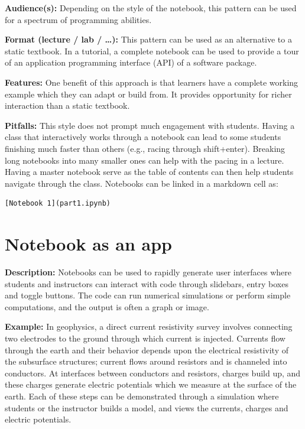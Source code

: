 \documentclass[]{book}
\begin{document}
\textbf{Audience(s):} Depending on the style of the notebook, this
pattern can be used for a spectrum of programming abilities.

\textbf{Format (lecture / lab / \ldots{}):} This pattern can be used as
an alternative to a static textbook. In a tutorial, a complete notebook
can be used to provide a tour of an application programming interface
(API) of a software package.

\textbf{Features:} One benefit of this approach is that learners have a
complete working example which they can adapt or build from. It provides
opportunity for richer interaction than a static textbook.

\textbf{Pitfalls:} This style does not prompt much engagement with
students. Having a class that interactively works through a notebook can
lead to some students finishing much faster than others (e.g., racing
through shift+enter). Breaking long notebooks into many smaller ones can
help with the pacing in a lecture. Having a master notebook serve as the
table of contents can then help students navigate through the class.
Notebooks can be linked in a markdown cell as:

\begin{verbatim}
[Notebook 1](part1.ipynb)
\end{verbatim}

\section{Notebook as an app}\label{notebook-as-an-app}

\textbf{Description:} Notebooks can be used to rapidly generate user
interfaces where students and instructors can interact with code through
slidebars, entry boxes and toggle buttons. The code can run numerical
simulations or perform simple computations, and the output is often a
graph or image.

\textbf{Example:} In geophysics, a direct current resistivity survey
involves connecting two electrodes to the ground through which current
is injected. Currents flow through the earth and their behavior depends
upon the electrical resistivity of the subsurface structures; current
flows around resistors and is channeled into conductors. At interfaces
between conductors and resistors, charges build up, and these charges
generate electric potentials which we measure at the surface of the
earth. Each of these steps can be demonstrated through a simulation
where students or the instructor builds a model, and views the currents,
charges and electric potentials.
\end{document}
